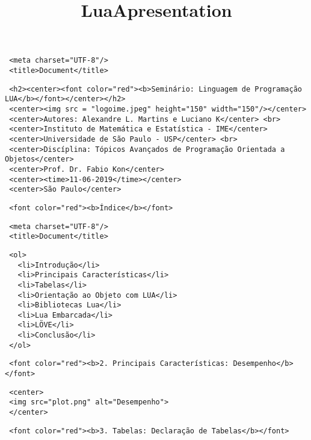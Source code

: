 \documentclass[11pt]{article}
\title{LuaApresentation}
\begin{document}
    
    
    \maketitle
    
    

    
    \begin{verbatim}
 <meta charset="UTF-8"/>
 <title>Document</title>
\end{verbatim}

\begin{verbatim}
 <h2><center><font color="red"><b>Seminário: Linguagem de Programação LUA</b></font></center></h2>
 <center><img src = "logoime.jpeg" height="150" width="150"/></center>      
 <center>Autores: Alexandre L. Martins e Luciano K</center> <br>
 <center>Instituto de Matemática e Estatística - IME</center>
 <center>Universidade de São Paulo - USP</center> <br>
 <center>Discíplina: Tópicos Avançados de Programação Orientada a Objetos</center>
 <center>Prof. Dr. Fabio Kon</center>     
 <center><time>11-06-2019</time></center>
 <center>São Paulo</center>
\end{verbatim}

    \begin{verbatim}
 <font color="red"><b>Índice</b></font>
\end{verbatim}

\begin{verbatim}
 <meta charset="UTF-8"/>
 <title>Document</title>
\end{verbatim}

\begin{verbatim}
 <ol>
   <li>Introdução</li>
   <li>Principais Características</li>
   <li>Tabelas</li>
   <li>Orientação ao Objeto com LUA</li>
   <li>Bibliotecas Lua</li>
   <li>Lua Embarcada</li>
   <li>LÖVE</li>
   <li>Conclusão</li>
 </ol>
\end{verbatim}

    \begin{verbatim}
 <font color="red"><b>2. Principais Características: Desempenho</b></font>
\end{verbatim}

    \begin{verbatim}
 <center>
 <img src="plot.png" alt="Desempenho">
 </center>     
\end{verbatim}

    \begin{verbatim}
 <font color="red"><b>3. Tabelas: Declaração de Tabelas</b></font>
\end{verbatim}
\end{document}
